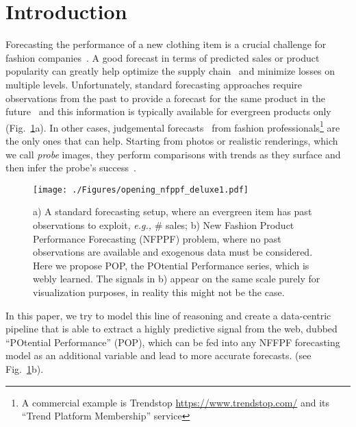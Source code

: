 \documentclass[runningheads]{llncs}
\begin{document}
\section{Introduction}
\label{sec:intro}
Forecasting the performance of a new clothing item is a crucial challenge for fashion companies~\cite{cheng2021fashion,fildes2019retail}. A good forecast in terms of predicted sales or product popularity can greatly help optimize the supply chain~\cite{ren2020demand} and minimize losses on multiple levels. Unfortunately, standard forecasting approaches require observations from the past to provide a forecast for the same product in the future~\cite{FPAP2,al2017fashion} and this information is typically available for evergreen products only (Fig.~\ref{fig:opening_nfppf_deluxe}a). In other cases, judgemental forecasts~\cite{FPAP2} from fashion professionals\footnote{A commercial example is Trendstop \url{https://www.trendstop.com/} and its ``Trend Platform Membership'' service} are the only ones that can help. Starting from photos or realistic renderings, which we call \emph{probe} images, they perform comparisons with trends as they surface and then infer the probe's success~\cite{ren2020demand}. 
\begin{figure}[t!]
	\centering
	\small
	\texttt{[image: ./Figures/opening\_nfppf\_deluxe1.pdf]} 
	\caption{\footnotesize a) A standard forecasting setup, where an evergreen item has past observations to exploit, \textit{e.g.,} \# sales; b) New Fashion Product Performance Forecasting (NFPPF) problem, where no past observations are available and \mbox{exogenous} data must be considered. Here we propose POP, the POtential Performance series, which is webly learned. The signals in b) appear on the same scale purely for visualization purposes, in reality this might not be the case.}
	\label{fig:opening_nfppf_deluxe}
\end{figure}
In this paper, we try to model this line of reasoning and create a data-centric~\cite{motamedi2021data} pipeline that is able to extract a highly predictive signal from the web, dubbed ``POtential Performance'' (POP), which can be fed into any NFFPF forecasting model as an additional variable and lead to more accurate forecasts. (see  Fig.~\ref{fig:opening_nfppf_deluxe}b). 
\end{document}
